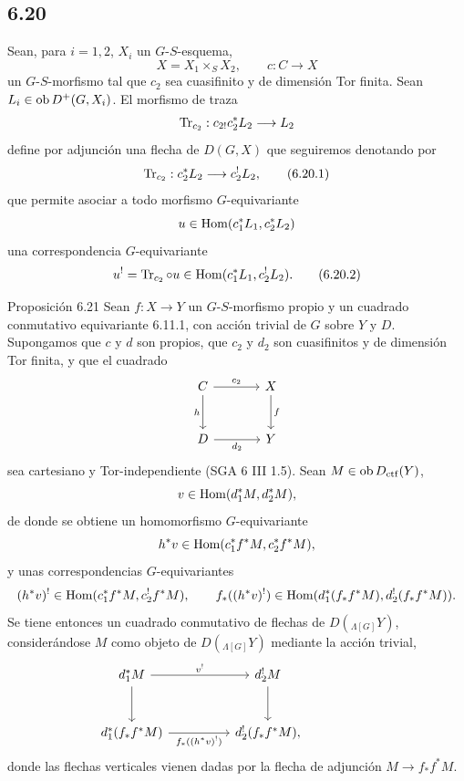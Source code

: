 \subsection*{6.20}
Sean, para $i=1,2$, $X_i$ un $G$-$S$-esquema,
\[
X=X_1\times_SX_2,\qquad c:C\to X
\]
un $G$-$S$-morfismo tal que $c_2$ sea cuasifinito y de dimensión Tor finita. Sean $L_i\in\operatorname{ob} D^+(G,X_i)$. El morfismo de traza
\[
\operatorname{Tr}_{c_2}:c_{2!}c_2^*L_2\longrightarrow L_2
\]
define por adjunción una flecha de $D(G,X)$ que seguiremos denotando por
\begin{equation}
\operatorname{Tr}_{c_2}:c_2^*L_2\longrightarrow c_2^!L_2,
\tag{6.20.1}
\end{equation}
que permite asociar a todo morfismo $G$-equivariante
\[
u\in\operatorname{Hom}(c_1^*L_1,c_2^*L_2)
\]
una correspondencia $G$-equivariante
\begin{equation}
u^! = \operatorname{Tr}_{c_2}\circ u\in\operatorname{Hom}(c_1^*L_1,c_2^!L_2).
\tag{6.20.2}
\end{equation}

\begin{statement}{Proposición 6.21}
Sean $f:X\to Y$ un $G$-$S$-morfismo propio y un cuadrado conmutativo equivariante 6.11.1, con acción trivial de $G$ sobre $Y$ y $D$. Supongamos que $c$ y $d$ son propios, que $c_2$ y $d_2$ son cuasifinitos y de dimensión Tor finita, y que el cuadrado
\[
\begin{tikzcd}[column sep=large,row sep=large]
C \arrow[r,"c_2"] \arrow[d,"h"'] & X \arrow[d,"f"]\\
D \arrow[r,"d_2"'] & Y
\end{tikzcd}
\]
sea cartesiano y Tor-independiente (SGA 6 III 1.5). Sean $M\in\operatorname{ob} D_{\mathrm{ctf}}(Y)$,
\[
v\in\operatorname{Hom}(d_1^*M,d_2^*M),
\]
de donde se obtiene un homomorfismo $G$-equivariante
\[
h^*v\in\operatorname{Hom}(c_1^*f^*M,c_2^*f^*M),
\]
y unas correspondencias $G$-equivariantes
\[
(h^*v)^!\in\operatorname{Hom}(c_1^*f^*M,c_2^!f^*M),
\qquad
f_*((h^*v)^!)\in\operatorname{Hom}(d_1^*(f_*f^*M),d_2^!(f_*f^*M)).
\]
Se tiene entonces un cuadrado conmutativo de flechas de $D({}_{\Lambda[G]}Y)$, considerándose $M$ como objeto de $D({}_{\Lambda[G]}Y)$ mediante la acción trivial,
\[
\begin{tikzcd}[column sep=huge,row sep=large]
d_1^*M \arrow[r,"v^!"] \arrow[d] & d_2^!M \arrow[d] & {}\\
d_1^*(f_*f^*M) \arrow[r,"f_*((h^*v)^!)"'] & d_2^!(f_*f^*M),
\end{tikzcd}
\]
donde las flechas verticales vienen dadas por la flecha de adjunción $M\to f_*f^*M$.
\end{statement}

